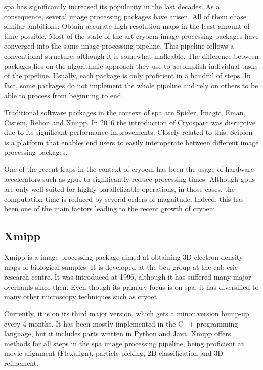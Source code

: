 \documentclass[../main.tex]{subfiles}
\begin{document}
\Gls{spa} has significantly increased its popularity in the last decades. As a consequence, several image processing packages have arisen. All of them chase similar ambitions: Obtain accurate high resolution maps in the least amount of time possible. Most of the state-of-the-art \gls{cryoem} image processing packages have converged into the same image processing pipeline. This pipeline follows a conventional structure, although it is somewhat malleable. The difference between packages lies on the algorithmic approach they use to accomplish individual tasks of the pipeline. Usually, each package is only proficient in a handful of steps. In fact, some packages do not implement the whole pipeline and rely on others to be able to process from beginning to end.

Traditional software packages in the context of \gls{spa} are Spider\cite{shaikh2008}, Imagic, Eman\cite{ludke2000}, Cistem\cite{grigorieff2018}, Relion\cite{scheres2021} and Xmipp\cite{sorzano2004}. In 2016 the introduction of Cryosparc\cite{cryosparc} was disruptive due to its significant performance improvements. Closely related to this, Scipion\cite{delarosa2016} is a platform that enables end users to easily interoperate between different image processing packages.

One of the recent leaps in the context of \gls{cryoem} has been the usage of hardware accelerators such as \glspl{gpu} to significantly reduce processing times. Although \glspl{gpu} are only well suited for highly parallelizable operations, in those cases, the computation time is reduced by several orders of magnitude. Indeed, this has been one of the main factors leading to the recent growth of \gls{cryoem}.

\subsection{Xmipp}
Xmipp is a image processing package aimed at obtaining 3D electron density maps of biological samples. It is developed at the \gls{bcu} group at the \gls{cnb}-\gls{csic} research centre. It was introduced at 1996, although it has suffered many major overhauls since then. Even though its primary focus is on \gls{spa}, it has diversified to many other microscopy techniques such as \gls{cryoet}\cite{sorzano2004}.

Currently, it is on its third major version, which gets a minor version bump-up every 4 months. It has been mostly implemented in the C++ programming language, but it includes parts written in Python and Java. Xmipp offers methods for all steps in the \gls{spa} image processing pipeline, being proficient at movie alignment (Flexalign)\cite{strelak2021a}, particle picking, 2D classification and 3D refinement.
\end{document}
